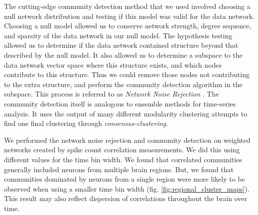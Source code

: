 \documentclass[a4paper,12pt]{article}
\theoremstyle{definition}
\begin{document}
The cutting-edge community detection method that we used involved choosing a null network distribution and testing if this model was valid for the data network. Choosing a null model allowed us to conserve network strength, degree sequence, and sparsity of the data network in our null model. The hypothesis testing allowed us to determine if the data network contained structure beyond that described by the null model. It also allowed us to determine a subspace to the data network vector space where this structure exists, and which nodes contribute to this structure. Thus we could remove those nodes not contributing to the extra structure, and perform the community detection algorithm in the subspace. This process is referred to as \textit{Network Noise Rejection} \cite{humphries}. The community detection itself is analogous to ensemble methods for time-series analysis. It uses the output of many different modularity clustering attempts to find one final clustering through \textit{consensus-clustering}.

We performed the network noise rejection and community detection on weighted networks created by spike count correlation measurements. We did this using different values for the time bin width. We found that correlated communities generally included neurons from multiple brain regions. But, we found that communities dominated by neurons from a single region were more likely to be observed when using a smaller time bin width (fig. \ref{fig:regional_cluster_maps}). This result may also reflect dispersion of correlations throughout the brain over time.
\end{document}
